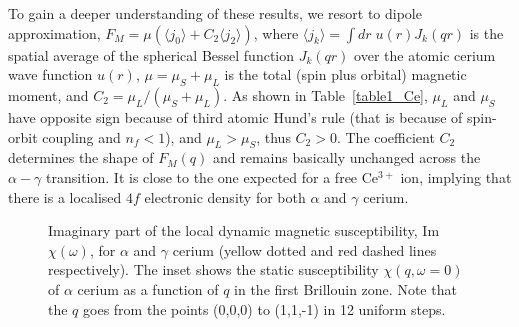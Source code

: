 \documentclass[10pt]{ruthesis}
\begin{document}
{To gain a deeper understanding of these results, we resort to dipole
approximation, $F_M = \mu (\langle j_0 \rangle + C_2
\langle j_2 \rangle)$, where $\langle j_k \rangle = \int dr\; u(r)
J_k(qr)$ is the spatial average of the spherical Bessel function
$J_k(qr)$ over the atomic cerium wave function $u(r)$,
$\mu=\mu_S+\mu_L$ is the total (spin plus orbital) magnetic moment,
and $C_2 = \mu_L/(\mu_S + \mu_L)$.  As shown in Table~\ref{table1_Ce},
$\mu_L$ and $\mu_S$ have opposite sign because of third atomic Hund's
rule (that is because of spin-orbit coupling and $n_f<1$), and
$\mu_L>\mu_S$, thus $C_2>0$.  The coefficient $C_2$ determines the
shape of $F_M(q)$ and remains basically unchanged across the
$\alpha-\gamma$ transition. It is close to the one expected for a free
Ce$^{3+}$ ion, implying that there is a localised $4f$ electronic
density for both $\alpha$ and $\gamma$ cerium.





%
\begin{figure}[!t]
\caption{
  Imaginary part of the local dynamic magnetic susceptibility,
  Im$\chi(\omega)$, for $\alpha$ and $\gamma$ cerium (yellow dotted and red dashed lines  respectively). The inset shows the static
  susceptibility $\chi(q, \omega=0)$ of $\alpha$ cerium as a function of $q$ in the first Brillouin zone. Note that
  the $q$ goes from the points (0,0,0) to (1,1,-1) in 12 uniform
  steps.
}
\label{Susc_both}
\end{figure}
%
}
\end{document}
